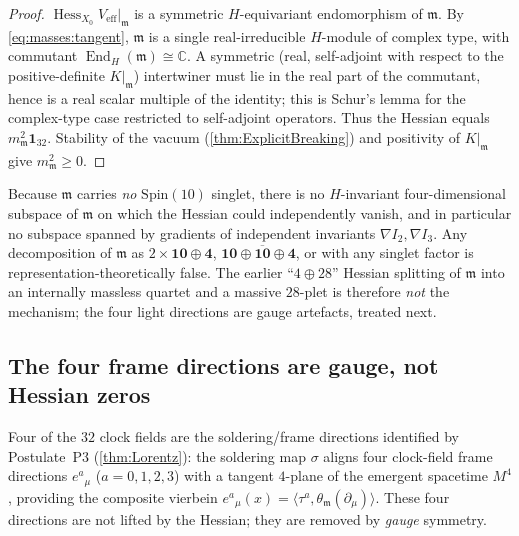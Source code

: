 \begin{proof}
$\operatorname{Hess}_{X_{0}}V_{\mathrm{eff}}|_{\mathfrak m}$ is a symmetric
$H$-equivariant endomorphism of $\mathfrak m$. By \eqref{eq:masses:tangent},
$\mathfrak m$ is a single real-irreducible $H$-module of complex type, with
commutant $\operatorname{End}_{H}(\mathfrak m)\cong\mathbb C$. A symmetric (real,
self-adjoint with respect to the positive-definite $K|_{\mathfrak m}$)
intertwiner must lie in the real part of the commutant, hence is a real scalar
multiple of the identity; this is Schur's lemma for the complex-type case
restricted to self-adjoint operators. Thus the Hessian equals
$m_{\mathfrak m}^{2}\mathbf 1_{32}$. Stability of the vacuum
(\autoref{thm:ExplicitBreaking}) and positivity of $K|_{\mathfrak m}$ give
$m_{\mathfrak m}^{2}\ge 0$.
\end{proof}

\begin{remark}\label{rmk:masses:nosinglet}
Because $\mathfrak m$ carries \emph{no} $\mathrm{Spin}(10)$ singlet, there is no
$H$-invariant four-dimensional subspace of $\mathfrak m$ on which the Hessian
could independently vanish, and in particular no subspace spanned by gradients
of independent invariants $\nabla I_{2},\nabla I_{3}$. Any decomposition of
$\mathfrak m$ as $2\times\mathbf{10}\oplus\mathbf 4$, $\mathbf{10}\oplus
\overline{\mathbf{10}}\oplus\mathbf 4$, or with any singlet factor is
representation-theoretically false. The earlier ``$4\oplus 28$'' Hessian
splitting of $\mathfrak m$ into an internally massless quartet and a massive
$28$-plet is therefore \emph{not} the mechanism; the four light directions are
gauge artefacts, treated next.
\end{remark}

\subsection{The four frame directions are gauge, not Hessian zeros}
\label{sec:masses:frame}

Four of the $32$ clock fields are the soldering/frame directions identified by
Postulate~P3 (\autoref{thm:Lorentz}): the soldering map $\sigma$ aligns four
clock-field frame directions $e^{a}{}_{\mu}$ ($a=0,1,2,3$) with a tangent
$4$-plane of the emergent spacetime $M^{4}$, providing the composite vierbein
$e^{a}{}_{\mu}(x)=\langle\tau^{a},\theta_{\mathfrak m}(\partial_{\mu})\rangle$.
These four directions are not lifted by the Hessian; they are removed by
\emph{gauge} symmetry.

